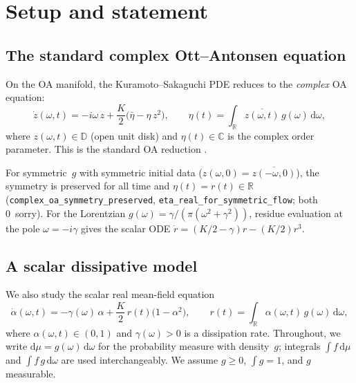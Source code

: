 \documentclass[11pt,a4paper]{article}
\theoremstyle{definition}
\newcommand{\D}{\mathbb{D}}
\newcommand{\R}{\mathbb{R}}
\newcommand{\C}{\mathbb{C}}
\begin{document}
\tableofcontents

\section{Setup and statement}

\subsection{The standard complex Ott--Antonsen equation}\label{sec:complex-oa}

On the OA manifold, the Kuramoto--Sakaguchi PDE reduces to the \emph{complex} OA equation:
\begin{equation}\label{eq:complex-oa}
\dot{z}(\omega,t) = -i\omega\,z + \frac{K}{2}\bigl(\bar\eta - \eta\,z^2\bigr), \qquad \eta(t) = \int_\R \overline{z(\omega,t)}\,g(\omega)\,\mathrm{d}\omega,
\end{equation}
where $z(\omega,t) \in \D$ (open unit disk) and $\eta(t) \in \C$ is the complex order parameter. This is the standard OA reduction \cite{ott-antonsen2008}.

For symmetric~$g$ with symmetric initial data ($z(\omega,0) = \overline{z(-\omega,0)}$), the symmetry is preserved for all time and $\eta(t) = r(t) \in \R$ (\texttt{complex\_oa\_symmetry\_preserved}, \texttt{eta\_real\_for\_symmetric\_flow}; both 0~sorry). For the Lorentzian $g(\omega) = \gamma/(\pi(\omega^2+\gamma^2))$, residue evaluation at the pole $\omega = -i\gamma$ gives the scalar ODE $\dot{r} = (K/2-\gamma)r - (K/2)r^3$.

\subsection{A scalar dissipative model}\label{sec:scalar-model}

We also study the scalar real mean-field equation
\begin{equation}\label{eq:oa}
\dot{\alpha}(\omega,t) = -\gamma(\omega)\,\alpha + \frac{K}{2}\,r(t)\bigl(1 - \alpha^2\bigr), \qquad r(t) = \int_\R \alpha(\omega,t)\,g(\omega)\,\mathrm{d}\omega,
\end{equation}
where $\alpha(\omega,t) \in (0,1)$ and $\gamma(\omega) > 0$ is a dissipation rate. Throughout, we write $\mathrm{d}\mu = g(\omega)\,\mathrm{d}\omega$ for the probability measure with density~$g$; integrals $\int f\,\mathrm{d}\mu$ and $\int f\,g\,\mathrm{d}\omega$ are used interchangeably. We assume $g \geq 0$, $\int g = 1$, and $g$ measurable.
\end{document}
